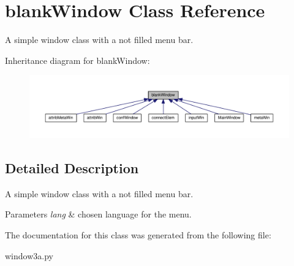 \hypertarget{classgui_1_1window3a_1_1blankWindow}{\section{blank\-Window Class Reference}
\label{classgui_1_1window3a_1_1blankWindow}
}


A simple window class with a not filled menu bar.  




Inheritance diagram for blank\-Window\-:\nopagebreak
\begin{figure}[H]
\begin{center}
\leavevmode
\includegraphics[width=350pt]{classgui_1_1window3a_1_1blankWindow__inherit__graph}
\end{center}
\end{figure}


\subsection{Detailed Description}
A simple window class with a not filled menu bar. 


\begin{DoxyParams}{Parameters}
{\em lang} & chosen language for the menu. \\
\hline
\end{DoxyParams}


The documentation for this class was generated from the following file\-:\begin{DoxyCompactItemize}
\item 
window3a.\-py\end{DoxyCompactItemize}
